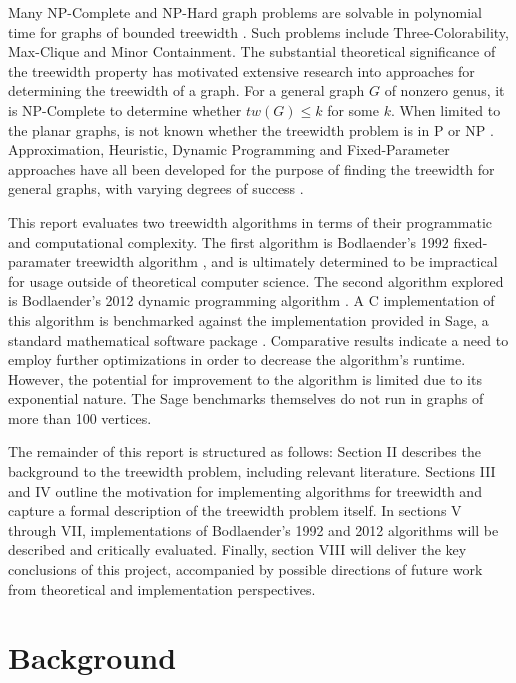\documentclass[12pt,conference]{IEEEtran}
\begin{document}
Many NP-Complete and NP-Hard graph problems are solvable in polynomial time for graphs of bounded treewidth \cite{bodlaender-treewidth-power}. Such problems include Three-Colorability, Max-Clique and Minor Containment. The substantial theoretical significance of the treewidth property has motivated extensive research into approaches for determining the treewidth of a graph. For a general graph $G$ of nonzero genus, it is NP-Complete to determine whether $tw(G) \leq k$ for some $k$. When limited to the planar graphs, is not known whether the treewidth problem is in P or NP \cite{planar-treewidth-unsolved}. Approximation, Heuristic, Dynamic Programming and Fixed-Parameter approaches have all been developed for the purpose of finding the treewidth for general graphs, with varying degrees of success \cite{treewidth-survey}. 

This report evaluates two treewidth algorithms in terms of their programmatic and computational complexity. The first algorithm is Bodlaender's 1992 fixed-paramater treewidth algorithm \cite{bodlaender-1992}, and is ultimately determined to be impractical for usage outside of theoretical computer science. The second algorithm explored is Bodlaender's 2012 dynamic programming algorithm \cite{bodlaender-2012}. A C implementation of this algorithm is benchmarked against the implementation provided in Sage, a standard mathematical software package \cite{sage-original}. Comparative results indicate a need to employ further optimizations in order to decrease the algorithm's runtime. However, the potential for improvement to the algorithm is limited due to its exponential nature. The Sage benchmarks themselves do not run in graphs of more than 100 vertices.

The remainder of this report is structured as follows: Section II describes the background to the treewidth problem, including relevant literature. Sections III and IV outline the motivation for implementing algorithms for treewidth and capture a formal description of the treewidth problem itself. In sections V through VII, implementations of Bodlaender's 1992 and 2012 algorithms will be described and critically evaluated. Finally, section VIII will deliver the key conclusions of this project, accompanied by possible directions of future work from theoretical and implementation perspectives.

\section{Background}
\end{document}
